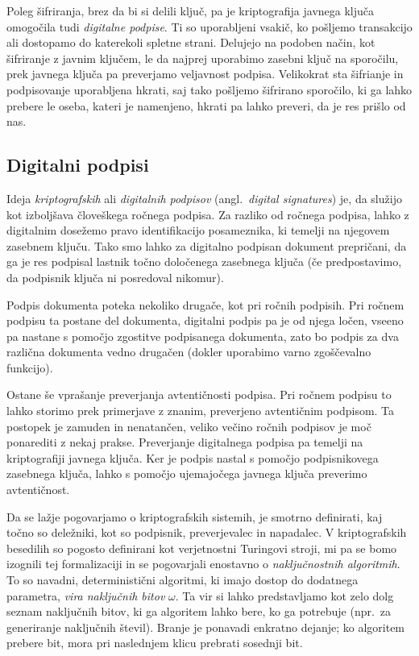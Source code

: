 \documentclass[isrm2, tisk]{fmfdelo}
\begin{document}
Poleg šifriranja, brez da bi si delili ključ, pa je kriptografija javnega ključa omogočila tudi
\textit{digitalne podpise}. Ti so uporabljeni vsakič, ko pošljemo transakcijo ali dostopamo do katerekoli
spletne strani. Delujejo na podoben način, kot šifriranje z javnim ključem, le da najprej uporabimo
zasebni ključ na sporočilu, prek javnega ključa pa preverjamo veljavnost podpisa. Velikokrat sta šifrianje
in podpisovanje uporabljena hkrati, saj tako pošljemo šifrirano sporočilo, ki ga lahko prebere le oseba,
kateri je namenjeno, hkrati pa lahko preveri, da je res prišlo od nas.

\subsection{Digitalni podpisi}
Ideja \textit{kriptografskih} ali \textit{digitalnih podpisov} (angl.\ \textit{digital signatures}) je,
da služijo kot izboljšava človeškega ročnega podpisa. Za razliko od ročnega podpisa, lahko z digitalnim
dosežemo pravo identifikacijo posameznika, ki temelji na njegovem zasebnem ključu. Tako smo lahko
za digitalno podpisan dokument prepričani, da ga je res podpisal lastnik točno določenega zasebnega ključa
(če predpostavimo, da podpisnik ključa ni posredoval nikomur).

Podpis dokumenta poteka nekoliko drugače, kot pri ročnih podpisih. Pri ročnem podpisu ta postane del
dokumenta, digitalni podpis pa je od njega ločen, vseeno pa nastane s pomočjo zgostitve podpisanega
dokumenta, zato bo podpis za dva različna dokumenta vedno drugačen (dokler uporabimo varno zgoščevalno
funkcijo).

Ostane še vprašanje preverjanja avtentičnosti podpisa. Pri ročnem podpisu to lahko storimo prek 
primerjave z znanim, preverjeno avtentičnim podpisom. Ta postopek je zamuden in nenatančen, veliko 
večino ročnih podpisov je moč ponarediti z nekaj prakse. Preverjanje digitalnega podpisa pa temelji 
na kriptografiji javnega ključa. Ker je podpis nastal s pomočjo podpisnikovega zasebnega ključa,
lahko s pomočjo ujemajočega javnega ključa preverimo avtentičnost.

Da se lažje pogovarjamo o kriptografskih sistemih, je smotrno definirati, kaj točno so deležniki,
kot so podpisnik, preverjevalec in napadalec. V kriptografskih besedilih so pogosto definirani kot
verjetnostni Turingovi stroji, mi pa se bomo izognili tej formalizaciji in se pogovarjali enostavno
o \textit{naključnostnih algoritmih}. To so navadni, deterministični algoritmi, ki imajo dostop do
dodatnega parametra, \textit{vira naključnih bitov} $\omega$. Ta vir si lahko predstavljamo kot zelo
dolg seznam naključnih bitov, ki ga algoritem lahko bere, ko ga potrebuje (npr.\ za generiranje
naključnih števil). Branje je ponavadi enkratno dejanje; ko algoritem prebere bit, mora pri
naslednjem klicu prebrati sosednji bit.
\end{document}
